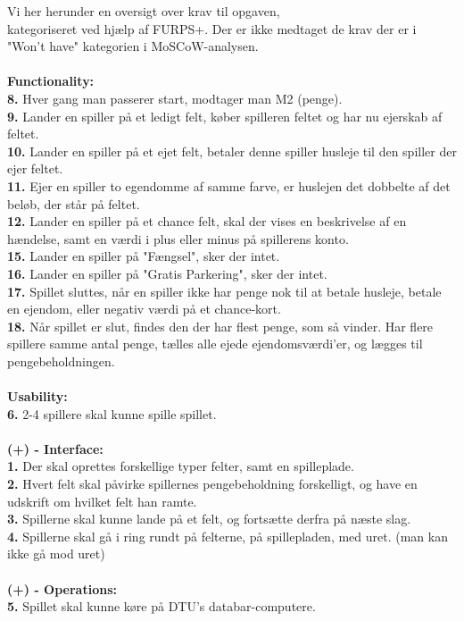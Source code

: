 \pagebreak

\noindent Vi her herunder en oversigt over krav til opgaven, \\ kategoriseret ved hjælp af FURPS+. Der er ikke medtaget de krav der er i "Won't have" kategorien i MoSCoW-analysen.
\\\\\textbf{Functionality:}\\
    \textbf{8.} Hver gang man passerer start, modtager man M2 (penge). \\
    \textbf{9.} Lander en spiller på et ledigt felt, køber spilleren feltet og har nu ejerskab af feltet. \\
    \textbf{10.} Lander en spiller på et ejet felt, betaler denne spiller husleje til den spiller der ejer feltet. \\
    \textbf{11.} Ejer en spiller to egendomme af samme farve, er huslejen det dobbelte af det beløb, der står på feltet. \\
    \textbf{12.} Lander en spiller på et chance felt, skal der vises en beskrivelse af en hændelse, samt en værdi i plus eller minus på spillerens konto. \\
    \textbf{15.} Lander en spiller på "Fængsel", sker der intet. \\
    \textbf{16.} Lander en spiller på "Gratis Parkering", sker der intet. \\
    \textbf{17.} Spillet sluttes, når en spiller ikke har penge nok til at betale husleje, betale en ejendom, eller negativ værdi på et chance-kort. \\
    \textbf{18.} Når spillet er slut, findes den der har flest penge, som så vinder. Har flere spillere samme antal penge, tælles alle ejede ejendomsværdi’er, og lægges til pengebeholdningen.
\\\\\textbf{Usability:}\\
    \textbf{6.} 2-4 spillere skal kunne spille spillet.
\\\\\textbf{(+) - Interface:}\\
    \textbf{1.} Der skal oprettes forskellige typer felter, samt en spilleplade. \\
    \textbf{2.} Hvert felt skal påvirke spillernes pengebeholdning forskelligt, og have en udskrift om hvilket felt han ramte. \\
    \textbf{3.} Spillerne skal kunne lande på et felt, og fortsætte derfra på næste slag. \\
    \textbf{4.} Spillerne skal gå i ring rundt på felterne, på spillepladen, med uret. (man kan ikke gå mod uret)
\\\\\textbf{(+) - Operations:}\\
    \textbf{5.} Spillet skal kunne køre på DTU’s databar-computere. \\

